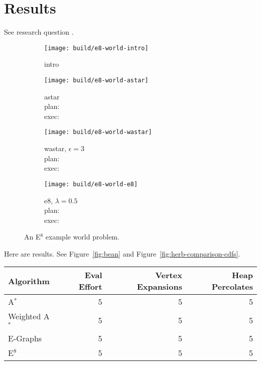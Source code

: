 \section{Results}

See research question \label{ques:e8-comparisons}.

\begin{figure}
   \centering
   
   
   
   \begin{subfigure}[t]{0.47\textwidth}
      \centering
      \texttt{[image: build/e8-world-intro]}
      \caption{intro}
   \end{subfigure}%
   \quad%
   \begin{subfigure}[t]{0.47\textwidth}
      \centering
      \texttt{[image: build/e8-world-astar]}
      \caption{astar\\
         plan: \worldstatsastarplan\\
         exec: \worldstatsastarexec}
   \end{subfigure}%
   \quad%
   \begin{subfigure}[t]{0.47\textwidth}
      \centering
      \texttt{[image: build/e8-world-wastar]}
      \caption{wastar, $\epsilon=3$\\
         plan: \worldstatswastarplan\\
         exec: \worldstatswastarexec}
   \end{subfigure}%
   \quad%
   \begin{subfigure}[t]{0.47\textwidth}
      \centering
      \texttt{[image: build/e8-world-e8]}
      \caption{e8, $\lambda=0.5$\\
         plan: \worldstatseEplan\\
         exec: \worldstatseEexec}
   \end{subfigure}
   \caption{An E$^8$ example world problem.}
\end{figure}

Here are results.
See Figure~\ref{fig:bean} and Figure~\ref{fig:herb-comparison-cdfs}.

\begin{center}
\begin{tabular}{lrrr}
\toprule
Algorithm & Eval Effort & Vertex Expansions & Heap Percolates \\
\midrule
A$^*$ & 5 & 5 & 5 \\
Weighted A$^*$ & 5 & 5 & 5 \\
E-Graphs & 5 & 5 & 5 \\
E$^8$ & 5 & 5 & 5 \\
\bottomrule
\end{tabular}
\end{center}
